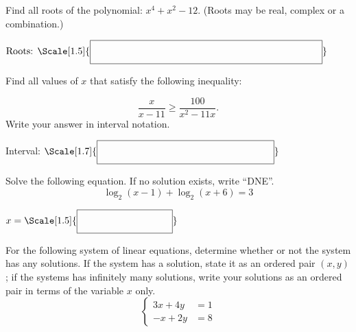 \begin{questions}

\question[6] Find all roots of the polynomial: $x^4 + x^2 - 12$. (Roots may be real, complex or a combination.)

\vfill

$
            \mbox{Roots: } \Scale[1.5]{\boxed{ \phantom{\dfrac{a}{b}} \hspace{8cm} }}
            $

\newpage

\question[8] Find all values of $x$ that satisfy the following inequality:

\[\displaystyle \frac{x}{x-11}\displaystyle \ge \frac{100}{x^2-11x}.\] Write your answer in interval notation. %

\vfill
Interval: $\Scale[1.7]{\boxed{ \phantom{\dfrac{a}{b}} \hspace{6cm} }}$






\question[7] Solve the following equation. If no solution exists, write ``DNE''.
\[\log_2 (x-1)+\log_2 (x+6)=3\]

    \vfill

$
                x = \Scale[1.5]{\boxed{ \phantom{\dfrac{a}{b}} \hspace{3cm} }}
            $

\newpage
\question[8]
For the following system of linear equations, determine whether or not the system has any solutions. If the system has a solution, state it as an ordered pair $(x,y)$; if the systems has infinitely many solutions, write your solutions as an ordered pair in terms of the variable $x$ only.
$$\begin{cases}
3 x  +  4 y & = 1 \\
- x  +  2 y & = 8
\end{cases}$$


\end{questions}
